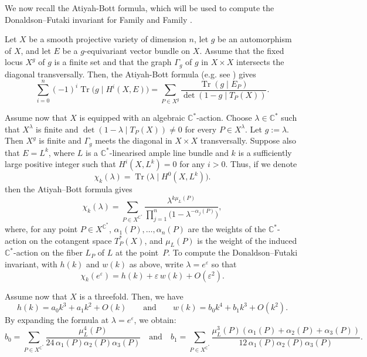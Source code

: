 \documentclass[12pt]{amsart}
\theoremstyle{definition}
\theoremstyle{remark}
\newcommand{\C}{\mathbb{C}}
\begin{document}
We now recall the Atiyah-Bott formula, which will be used to compute the Donaldson--Futaki invariant for
Family  and Family .

Let $X$ be a smooth projective variety of dimension $n$, let $g$ be an automorphism of $X$, and let $E$ be a $g$-equivariant vector bundle on $X$.
Assume that the fixed locus $X^g$ of $g$ is a finite set and that the graph $\Gamma_g$ of $g$ in $X\times X$ intersects the diagonal transversally.  Then, the  Atiyah-Bott formula (e.g. see \cite[Appendix to Exp. III, Cor. 6.12]{SGA5}) gives
$$
\sum_{i=0}^{n} (-1)^i \operatorname{Tr}\bigl(g \mid H^i(X,E)\bigr)
=
\sum_{P \in X^g}
\frac{\operatorname{Tr}(g \mid E_P)}{\det(1-g \mid T_P(X))}.
$$

Assume now that $X$ is equipped with an algebraic $\C^*$-action.
Choose $\lambda\in \C^*$ such that $X^\lambda$ is finite and $\det(1-\lambda\mid T_P(X))\neq 0$ for every $P\in X^\lambda$.
Let $g:=\lambda$.
Then $X^g$ is finite and $\Gamma_g$ meets the diagonal in $X\times X$ transversally.
Suppose also that  $E=L^k$, where $L$ is a $\mathbb{C}^*$-linearised ample line bundle and $k$ is a sufficiently large positive integer such that $H^i(X,L^k)=0$ for any $i>0$. Thus, if we denote
$$
\chi_k(\lambda)
=
\operatorname{Tr}\bigl(\lambda \mid H^0(X,L^k)\bigr).
$$
then the Atiyah--Bott formula gives
$$
\chi_k(\lambda)
=
\sum_{P\in X^{\mathbb{C}^*}}
\frac{\lambda^{k\mu_L(P)}}{\prod_{j=1}^n \bigl(1-\lambda^{-\alpha_j(P)}\bigr)},
$$
where, for any point $P\in X^{\mathbb{C}^*}$, $\alpha_1(P),\dots,\alpha_n(P)$ are the weights of the $\mathbb{C}^*$-action on
the cotangent space $T^*_P(X)$, and $\mu_L(P)$ is the weight of the induced $\mathbb{C}^*$-action on the fiber $L_P$ of  $L$ at the point~$P$. To compute the Donaldson--Futaki invariant, with $h(k)$ and $w(k)$ as above, write $\lambda=e^\varepsilon$ so that
$$
\chi_k(e^\varepsilon)
=
h(k)+\varepsilon\,w(k)+O(\varepsilon^2).
$$

Assume now that $X$ is a threefold. Then, we have
$$
h(k)=a_0k^3+a_1k^2+O(k)
\qquad\text{and}\qquad
w(k)=b_0k^4+b_1k^3+O(k^2).
$$
By expanding the  formula at $\lambda=e^\varepsilon$, we obtain:
\begin{equation}
\label{equation:ab}
b_0=\sum_{P\in X^{\C^*}}\frac{\mu^4_L(P)}{24\,\alpha_{1}(P)\alpha_{2}(P)\alpha_{3}(P)}
\quad
\text{and}
\quad
b_1=\sum_{P\in X^{\C^*}}\frac{\mu^3_L(P)(\alpha_{1}(P)+\alpha_{2}(P)+\alpha_{3}(P))}{12\,\alpha_{1}(P)\alpha_{2}(P)\alpha_{3}(P)}.
\end{equation}
\end{document}
